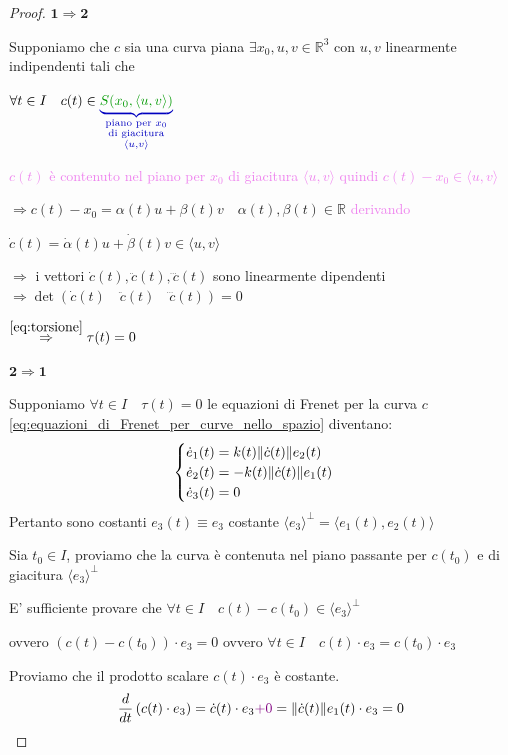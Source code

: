         \begin{proof}
        \mbox{}

        $\mathbf{1 \Rightarrow 2}$

        Supponiamo che $c$ sia una curva piana $\exists x_0,u,v \in \mathbb{R}^3$ con $u,v$ linearmente indipendenti tali che 

        $\forall t \in I \quad c(t) \in \color{blu} \underbrace{\textcolor{verde}{S(x_0, \langle u,v \rangle)}}_{\substack{\text{piano per } x_0 \\ \text{di giacitura} \\ \langle u,v \rangle}}$
        
        \textcolor{violet}{$c(t)$ è contenuto nel piano per $x_0$ di giacitura $\langle u,v \rangle$ quindi $c(t) - x_0 \in \langle u,v \rangle$}

        $\Rightarrow c(t) - x_0 = \alpha (t)u+ \beta(t)v \quad \alpha(t), \beta(t) \in \mathbb{R}$ \textcolor{violet}{derivando}

        $ \dot{c}(t) = \dot{\alpha}(t) u + \dot{\beta}(t) v  \in \langle u,v \rangle$ 
        
        $\Rightarrow$ i vettori $\dot{c}(t), \ddot{c}(t), \dddot{c}(t)$ sono linearmente dipendenti $\Rightarrow \det(\dot{c}(t) \quad \ddot{c}(t) \quad \dddot{c}(t)) = 0$

        $\overset{\eqref{eq:torsione}}{\Rightarrow} \tau(t) = 0$

        $\mathbf{2 \Rightarrow 1}$

        Supponiamo $\forall t \in I \quad \tau(t) = 0$ le equazioni di Frenet per la curva $c$ \eqref{eq:equazioni_di_Frenet_per_curve_nello_spazio} diventano:
        \begin{equation*}
        \begin{cases}
            \dot{e}_1(t) = k(t) \lVert\dot{c}(t)\rVert e_2(t) \\
            \dot{e}_2(t) = -k(t) \lVert\dot{c}(t)\rVert e_1(t) \\
            \dot{e}_3(t) = 0
        \end{cases}
        \end{equation*}
        Pertanto sono costanti $e_3(t) \equiv e_3$ costante $\langle e_3 \rangle^\perp = \langle e_1(t), e_2(t) \rangle$

        Sia $t_0 \in I$, proviamo che la curva è contenuta nel piano passante per $c(t_0)$ e di giacitura $\langle e_3 \rangle^\perp$

        E' sufficiente provare che $\forall t \in I \quad c(t) - c(t_0) \in \langle e_3 \rangle^\perp$
        
        ovvero $\left(c(t) - c(t_0) \right) \cdot e_3 =0$ ovvero $\forall t \in I \quad c(t) \cdot e_3 = c(t_0) \cdot e_3$

        Proviamo che il prodotto scalare $c(t) \cdot e_3$ è costante.
        \[ \frac{d}{dt} \left( c(t) \cdot e_3 \right) = \dot{c}(t) \cdot e_3 \textcolor{violet}{+ 0} = \lVert\dot{c}(t)\rVert e_1(t) \cdot e_3 =0 \]
        \end{proof}
